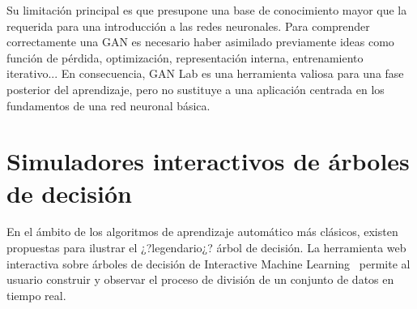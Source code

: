 Su limitación principal es que presupone una base de conocimiento mayor que la requerida para una introducción a las redes neuronales.
Para comprender correctamente una GAN es necesario haber asimilado previamente ideas como función de pérdida, optimización, representación interna, entrenamiento iterativo...
En consecuencia, GAN Lab es una herramienta valiosa para una fase posterior del aprendizaje, pero no sustituye a una aplicación centrada en los fundamentos de una red neuronal básica.

%
%

\section{Simuladores interactivos de árboles de decisión}
\label{sec:sota_arboles_decision}

En el ámbito de los algoritmos de aprendizaje automático más clásicos, existen propuestas para ilustrar el ¿?legendario¿? árbol de decisión.
La herramienta web interactiva sobre árboles de decisión de Interactive Machine Learning~\cite{InteractiveDecisionTrees} permite al usuario construir y observar el proceso de división de un conjunto de datos en tiempo real.


